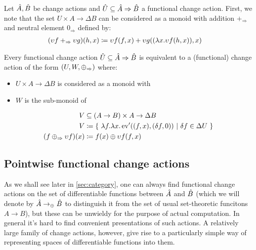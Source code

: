
\begin{prop}
  Let $\hat{A}, \hat{B}$ be change actions and $\hat{U} \subseteq \hat{A} \Rightarrow \hat{B}$
  a functional change action. First, we note that the set $U \times A \rightarrow \Delta B$ can be
  considered as a monoid with addition $+_\Rightarrow$ and neutral element $0_\Rightarrow$ defined by:
  \begin{align*}
    (\upsilon f +_\Rightarrow \upsilon g)(h, x) 
    &\coloneqq \upsilon f (f, x) + \upsilon g((\lambda x . \upsilon f (h, x)) , x)
  \end{align*}

  Every functional change action $\hat{U} \subseteq \hat{A} \Rightarrow \hat{B}$ is equivalent to
  a (functional) change action of the form $(U, W, \oplus_\Rightarrow)$ where:
  \begin{itemize}
  \item $U \times A \rightarrow \Delta B$ is considered as a monoid with
  \item $W$ is the sub-monoid of 
  \end{itemize}
  \begin{align*}
    V &\subseteq (A \rightarrow B) \times A \rightarrow \Delta B\\
    V &\coloneqq \{~
        \lambda f. \lambda x. \operatorname{ev}'((f, x), (\delta f, 0)) ~|~ \delta f \in \Delta U
        ~\}\\
    (f \oplus_\Rightarrow \upsilon f)(x) &\coloneqq f(x) \oplus \upsilon f(f, x)
  \end{align*}
\end{prop}

\subsection{Pointwise functional change actions}

As we shall see later in \cref{sec:category}, one can always find functional change actions on the set
of differentiable functions between $\hat{A}$ and $\hat{B}$ (which we will denote by 
$\hat{A} \rightarrow_\oplus \hat{B}$ to distinguish it from the set of usual set-theoretic funcitons
$A \rightarrow B$), but these can be unwieldy for 
the purpose of actual computation. In general it's hard to find convenient presentations of such
actions. A relatively large family of change actions, however, give rise to a particularly simple
way of representing spaces of differentiable functions into them.

